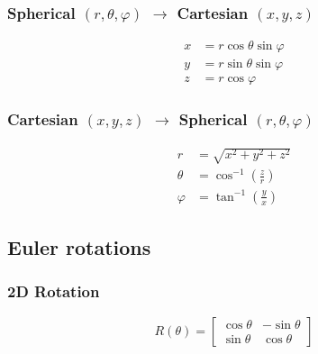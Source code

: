 \documentclass{article}
\newcommand{\phase}{\varphi}
\begin{document}
\subsubsection{Spherical $(r,\theta,\phase)$ $\rightarrow$ Cartesian $(x,y,z)$}
\begin{equation}
    \begin{aligned}
        x &= r \cos\theta\sin\phase \\
        y &= r \sin\theta\sin\phase \\
        z &= r \cos\phase
    \end{aligned}
\end{equation}
\subsubsection{Cartesian $(x,y,z)$ $\rightarrow$ Spherical $(r,\theta,\phase)$}
\begin{equation}
    \begin{aligned}
        r &= \sqrt{x^2+y^2+z^2} \\
        \theta &= \cos^{-1} \left(\frac{z}{r}\right) \\
        \phase &= \tan^{-1} \left(\frac{y}{x}\right)
    \end{aligned}
\end{equation}

\subsection{Euler rotations}

\subsubsection{2D Rotation}
\begin{equation}
    R(\theta) = \begin{bmatrix}
        \cos\theta & -\sin\theta \\
        \sin\theta & \cos\theta
    \end{bmatrix}
\end{equation}
\end{document}
